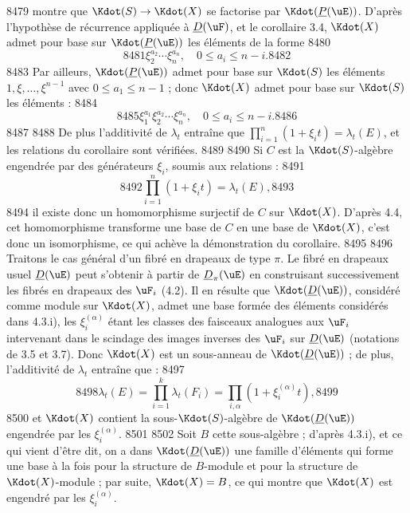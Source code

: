   8479	montre que $\Kdot(S) \to \Kdot(X)$ se factorise par $\Kdot(\underline{P}(\uE))$. D'apr\`es l'hypoth\`ese de r\'ecurrence appliqu\'ee \`a $\underline{D}(\uF)$, et le corollaire 3.4, $\Kdot(X)$ admet pour base sur $\Kdot(\underline{P}(\uE))$ les \'el\'ements de la forme
  8480	\[
  8481	\xi_2^{a_2} \cdots \xi_n^{a_n}, \quad 0 \leq a_i \leq n-i.
  8482	\]
  8483	Par ailleurs, $\Kdot(\underline{P}(\uE))$ admet pour base sur $\Kdot(S)$ les \'el\'ements $1, \xi, \dots, \xi^{n-1}$ avec $0 \leq a_1 \leq n-1$ ; donc $\Kdot(X)$ admet pour base sur $\Kdot(S)$ les \'el\'ements :
  8484	\[
  8485	\xi_1^{a_1} \xi_2^{a_2} \cdots \xi_n^{a_n}, \quad 0 \leq a_i \leq n-i.
  8486	\]
  8487	
  8488	De plus l'additivit\'e de $\lambda_t$ entra\^ine que $\prod_{i=1}^{n} (1 + \xi_i t) = \lambda_t(E)$, et les relations du corollaire sont v\'erifi\'ees.
  8489	
  8490	Si $C$ est la $\Kdot(S)$-alg\`ebre engendr\'ee par des g\'en\'erateurs $\xi_i$, soumis aux relations :
  8491	\[
  8492	\prod_{i=1}^{n} (1 + \xi_i t) = \lambda_t(E),
  8493	\]
  8494	il existe donc un homomorphisme surjectif de $C$ sur $\Kdot(X)$. D'apr\`es 4.4, cet homomorphisme transforme une base de $C$ en une base de $\Kdot(X)$, c'est donc un isomorphisme, ce qui ach\`eve la d\'emonstration du corollaire.
  8495	
  8496	Traitons le cas g\'en\'eral d'un fibr\'e en drapeaux de type $\pi$. Le fibr\'e en drapeaux usuel $\underline{D}(\uE)$ peut s'obtenir \`a partir de $\underline{D}_{\pi}(\uE)$ en construisant successivement les fibr\'es en drapeaux des $\uF_i$ (4.2). Il en r\'esulte que $\Kdot(\underline{D}(\uE))$, consid\'er\'e comme module sur $\Kdot(X)$, admet une base form\'ee des \'el\'ements consid\'er\'es dans 4.3.i), les $\xi_i^{(\alpha)}$ \'etant les classes des faisceaux analogues aux $\uF_i$ intervenant dans le scindage des images inverses des $\uF_i$ sur $\underline{D}(\uE)$ (notations de 3.5 et 3.7). Donc $\Kdot(X)$ est un sous-anneau de $\Kdot(\underline{D}(\uE))$ ; de plus, l'additivit\'e de $\lambda_t$ entra\^ine que :
  8497	\[
  8498	\lambda_t(E) = \prod_{i=1}^{k} \lambda_t(F_i) = \prod_{i,\alpha} (1 + \xi_i^{(\alpha)} t),
  8499	\]
  8500	et $\Kdot(X)$ contient la sous-$\Kdot(S)$-alg\`ebre de $\Kdot(\underline{D}(\uE))$ engendr\'ee par les $\xi_i^{(\alpha)}$.
  8501	
  8502	Soit $B$ cette sous-alg\`ebre ; d'apr\`es 4.3.i), et ce qui vient d'\^etre dit, on a dans $\Kdot(\underline{D}(\uE))$ une famille d'\'el\'ements qui forme une base \`a la fois pour la structure de $B$-module et pour la structure de $\Kdot(X)$-module ; par suite, $\Kdot(X) = B$, ce qui montre que $\Kdot(X)$ est engendr\'e par les $\xi_i^{(\alpha)}$.
